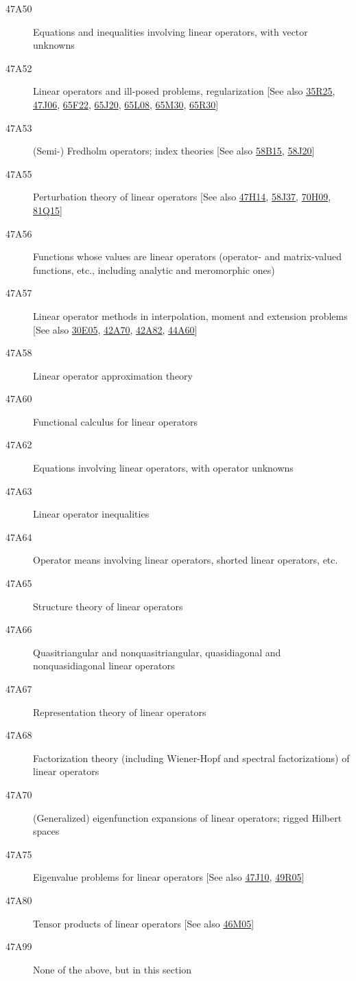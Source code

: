 \documentclass[letterpaper]{article}
\begin{document}
\begin{description}
\item [47A50]\label{47A50} Equations and inequalities involving linear operators, with vector unknowns
\item [47A52]\label{47A52} Linear operators and ill-posed problems, regularization [See also \hyperref[35R25]{35R25}, \hyperref[47J06]{47J06}, \hyperref[65F22]{65F22}, \hyperref[65J20]{65J20}, \hyperref[65L08]{65L08}, \hyperref[65M30]{65M30}, \hyperref[65R30]{65R30}]
\item [47A53]\label{47A53} (Semi-) Fredholm operators; index theories [See also \hyperref[58B15]{58B15}, \hyperref[58J20]{58J20}]
\item [47A55]\label{47A55} Perturbation theory of linear operators [See also \hyperref[47H14]{47H14}, \hyperref[58J37]{58J37}, \hyperref[70H09]{70H09}, \hyperref[81Q15]{81Q15}]
\item [47A56]\label{47A56} Functions whose values are linear operators (operator- and matrix-valued functions, etc., including analytic and meromorphic ones)
\item [47A57]\label{47A57} Linear operator methods in interpolation, moment and extension problems [See also \hyperref[30E05]{30E05}, \hyperref[42A70]{42A70}, \hyperref[42A82]{42A82}, \hyperref[44A60]{44A60}]
\item [47A58]\label{47A58} Linear operator approximation theory
\item [47A60]\label{47A60} Functional calculus for linear operators
\item [47A62]\label{47A62} Equations involving linear operators, with operator unknowns
\item [47A63]\label{47A63} Linear operator inequalities
\item [47A64]\label{47A64} Operator means involving linear operators, shorted linear operators, etc.
\item [47A65]\label{47A65} Structure theory of linear operators
\item [47A66]\label{47A66} Quasitriangular and nonquasitriangular, quasidiagonal and nonquasidiagonal linear operators
\item [47A67]\label{47A67} Representation theory of linear operators
\item [47A68]\label{47A68} Factorization theory (including Wiener-Hopf and spectral factorizations) of linear operators
\item [47A70]\label{47A70} (Generalized) eigenfunction expansions of linear operators; rigged Hilbert spaces
\item [47A75]\label{47A75} Eigenvalue problems for linear operators [See also \hyperref[47J10]{47J10}, \hyperref[49R05]{49R05}]
\item [47A80]\label{47A80} Tensor products of linear operators [See also \hyperref[46M05]{46M05}]
\item [47A99]\label{47A99} None of the above, but in this section
\end{description}
\end{document}
